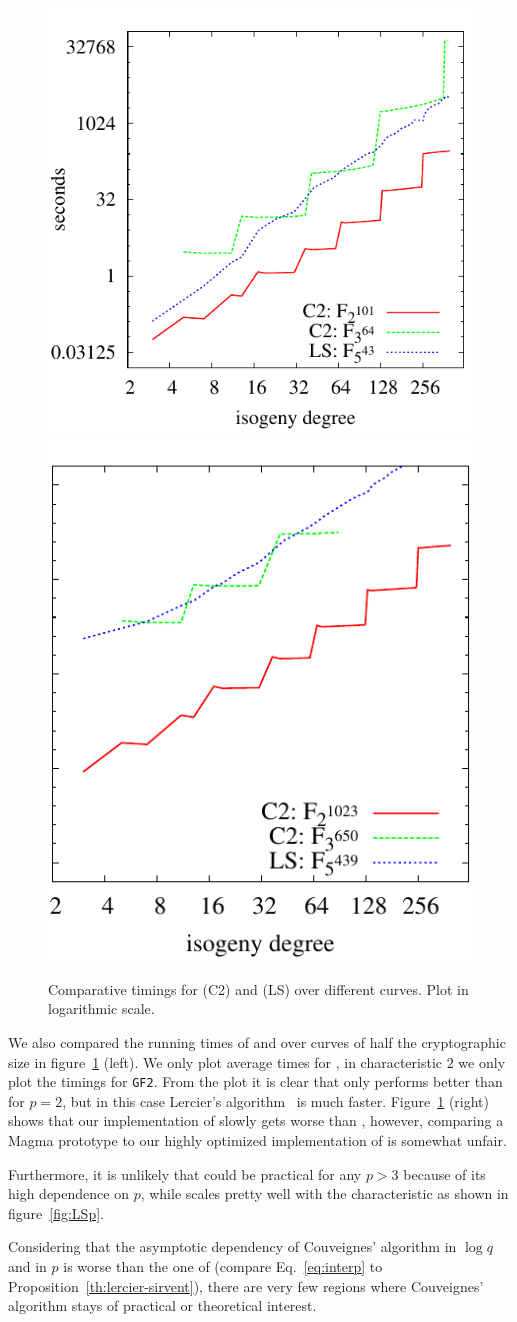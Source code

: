 \begin{figure}
  \centering
  \includegraphics[height=0.45\textwidth]{isogeny/C2-LS}
  \includegraphics[height=0.45\textwidth]{isogeny/C2-LS2}
  \caption{Comparative timings for \ctwoasfimc{} (C2) and
     (LS) over different curves. Plot in
    logarithmic scale.}
  \label{fig:comp}
\end{figure}

We also compared the running times of \ctwoasfimc{} and
 over curves of half the cryptographic size in
figure~\ref{fig:comp} (left). We only plot average times for \ctwo{}, in
characteristic $2$ we only plot the timings for \texttt{GF2}. From the
plot it is clear that \ctwoasfimc{} only performs better than
 for $p=2$, but in this case Lercier's
algorithm~\cite{lercier96} is much faster.  Figure~\ref{fig:comp}
(right) shows that our implementation of  slowly
gets worse than \ctwo{}, however, comparing a Magma prototype to our highly
optimized implementation of \ctwoasfimc{} is somewhat unfair.

Furthermore, it is unlikely that \ctwoasfimc{} could be practical for
any $p>3$ because of its high dependence on $p$, while
 scales pretty well with the characteristic as
shown in figure~\ref{fig:LSp}.

Considering that the asymptotic dependency of Couveignes' algorithm in
$\log q$ and in $p$ is worse than the one of 
(compare Eq.~\eqref{eq:interp} to
Proposition~\ref{th:lercier-sirvent}), there are very few regions
where Couveignes' algorithm stays of practical or theoretical
interest.

